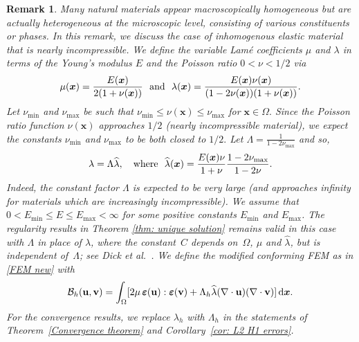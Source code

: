 \documentclass[11pt]{article}
\newcommand{\calB}{\mathcal{B}}
\newcommand{\vu}{{\bf u}}
\newcommand{\vv}{{\bf v}}
\newcommand{\bsx}{{\boldsymbol{x}}}
\numberwithin{equation}{section}
\newcommand{\veps}{{\boldsymbol{\varepsilon}}}
\newcommand{\ud}{\mathrm{d}}
\newtheorem{remark}{Remark}[section]
\begin{document}
\begin{remark} 
{\color{red} Many natural materials appear macroscopically homogeneous but are actually heterogeneous at the microscopic level, consisting of various constituents or phases. 
In this remark, we discuss the case of inhomogenous elastic material that is nearly incompressible. We define the variable Lam\'e coefficients $\mu$  and $\lambda$  in terms of the Young’s modulus $E$ and the Poisson ratio $0<\nu<1/2$ via 
\[\mu(\bsx)=\frac{E(\bsx)}{2(1+\nu(\bsx))}~~{\rm and}~~ \lambda(\bsx)= \frac{E(\bsx)\nu(\bsx)}{(1-2\nu(\bsx))(1+\nu(\bsx))}.
\]
Let $\nu_{\min}$ and $\nu_{\max}$ be such that $\nu_{\min}\le \nu(\bsx)\le \nu_{\max}$ for $\bsx \in \Omega.$ Since the Poisson ratio function  $\nu(\bsx)$ approaches $1/2$ (nearly incompressible material), we expect the constants $\nu_{\min}$ and $\nu_{\max}$ to be both closed to $1/2.$ Let $\Lambda =\frac{1}{1-2\nu_{\max}}$ and so, 
\[\lambda= \Lambda \widehat \lambda,\quad{\rm where}~~ \widehat \lambda (\bsx)=\frac{E(\bsx)\nu}{1+\nu}\frac{1-2\nu_{\max}}{1-2\nu}.\]
Indeed, the constant factor $\Lambda$   is expected to be very large (and approaches  infinity for materials which are increasingly incompressible).
 We assume that $0<E_{\min}\le E\le E_{\max}<\infty$  for some positive
constants $E_{\min}$ and $E_{\max}$. The regularity results in Theorem \ref{thm:
unique solution} remains valid in this case with $\Lambda$ in place of
$\lambda$, where  the constant~$C$ depends on~$\Omega$, $\mu$ and $\widehat
\lambda$, but is independent of~$\Lambda$; see Dick et al.~\cite[Theorem
3.2]{Dicketal2024}.
We define the modified conforming FEM as in  \eqref{FEM new} with  
\begin{equation*}
\calB_h(\vu,\vv)=\int_\Omega[2\mu\,\veps(\vu):\veps(\vv)+\Lambda_h
\widehat \lambda  (\nabla\cdot\vu)(\nabla\cdot\vv)]\,\ud\bsx.
\end{equation*} 
For the convergence results, we replace $\lambda_h$ with $\Lambda_h$ in the
statements of Theorem~\ref{Convergence theorem} and
Corollary~\ref{cor: L2 H1 errors}.}
\end{remark}
\end{document}

